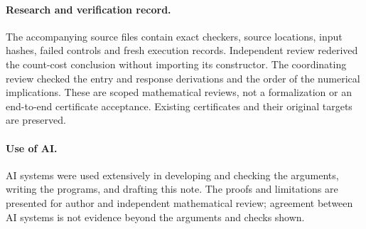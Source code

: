 \documentclass[11pt,a4paper]{article}
\begin{document}





\paragraph{Research and verification record.}
The accompanying source files contain exact checkers, source locations,
input hashes, failed controls and fresh execution records. Independent
review rederived the count-cost conclusion without importing its
constructor. The coordinating review checked the entry and response
derivations and the order of the numerical implications. These are scoped
mathematical reviews, not a formalization or an end-to-end certificate
acceptance. Existing certificates and their original targets are preserved.

\paragraph{Use of AI.}
AI systems were used extensively in developing and checking the arguments,
writing the programs, and drafting this note. The proofs and limitations
are presented for author and independent mathematical review; agreement
between AI systems is not evidence beyond the arguments and checks shown.
\end{document}
